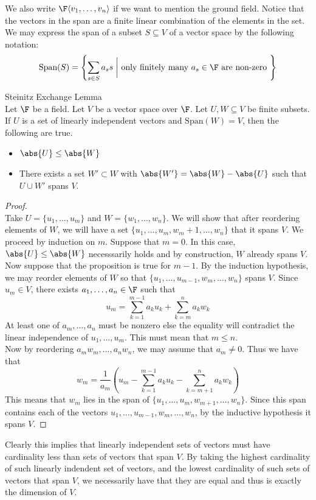 \documentclass[a4paper]{article}
\begin{document}
We also write $\F\langle v_1,\dots,v_n\rangle$ if we want to mention the ground field. Notice that the vectors in the span are a finite linear combination of the elements in the set. We may express the span of a subset $S\subseteq V$ of a vector space by the following notation: $$\text{Span}(S)=\left\{\sum_{s\in S}a_ss\;\bigg{|}\text{ only finitely many }a_s\in\F\text{ are non-zero }\right\}$$

\begin{thm}{Steinitz Exchange Lemma}{}\\
Let $\F$ be a field. Let $V$ be a vector space over $\F$. Let $U,W\subseteq V$ be finite subsets. If $U$ is a set of linearly independent vectors and $\text{Span}(W)=V$, then the following are true. 
\begin{itemize}
\item $\abs{U}\leq\abs{W}$
\item There exists a set $W'\subset W$ with $\abs{W'}=\abs{W}-\abs{U}$ such that $U\cup W'$ spans $V$. 
\end{itemize} 
\begin{proof}\\
Take $U=\{u_1,\dots,u_m\}$ and $W=\{w_1,\dots,w_n\}$. We will show that after reordering elements of $W$, we will have a set $\{u_1,\dots,u_m,w_m+1,\dots,w_n\}$ that it spans $V$. We proceed by induction on $m$. Suppose that $m=0$. In this case, $\abs{U}\leq\abs{W}$ necesssarily holds and by construction, $W$ already spans $V$. \\
Now suppose that the proposition is true for $m-1$. By the induction hypothesis, we may reorder elements of $W$ so that $\{u_1,\dots,u_{m-1},w_m,\dots,w_n\}$ spans $V$. Since $u_m\in V$, there exists $a_1,\dots,a_n\in\F$ such that $$u_m=\sum_{k=1}^{m-1}a_ku_k+\sum_{k=m}^na_kw_k$$ At least one of $a_m,\dots,a_n$ must be nonzero else the equality will contradict the linear independence of $u_1,\dots,u_m$. This must mean that $m\leq n$. \\
Now by reordering $a_mw_m,\dots,a_nw_n$, we may assume that $a_m\neq 0$. Thus we have that $$w_m=\frac{1}{a_m}\left(u_m-\sum_{k=1}^{m-1}a_ku_k-\sum_{k=m+1}^na_kw_k\right)$$ This means that $w_m$ lies in the span of $\{u_1,\dots,u_m,w_{m+1},\dots,w_n\}$. Since this span contains each of the vectors $u_1,\dots,u_{m-1},w_m,\dots,w_n$, by the inductive hypothesis it spans $V$. 
\end{proof}
\end{thm}

Clearly this implies that linearly independent sets of vectors must have cardinality less than sets of vectors that span $V$. By taking the highest cardinality of such linearly indendent set of vectors, and the lowest cardinality of such sets of vectors that span $V$, we necessarily have that they are equal and thus is exactly the dimension of $V$. \\
\end{document}
